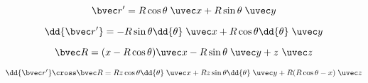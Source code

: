 
\begin{issues}
\issueDraft
\end{issues}

\begin{equation}
\bvec r' = R\cos\theta\; \uvec x + R\sin\theta\; \uvec y
\end{equation}

\begin{equation}
\dd{\bvec r'} = -R\sin \theta \dd{\theta}\; \uvec x + R\cos \theta \dd{\theta}\; \uvec y
\end{equation}

\begin{equation}
\bvec R = (x - R\cos\theta)\uvec x -R\sin\theta \;\uvec y+ z\ \uvec z
\end{equation}

\begin{equation}
\dd{\bvec r'} \cross \bvec R = Rz \cos\theta \dd{\theta} \;\uvec x + Rz\sin\theta \dd{\theta} \;\uvec y + R(R \cos\theta - x)\;\uvec z
\end{equation}

